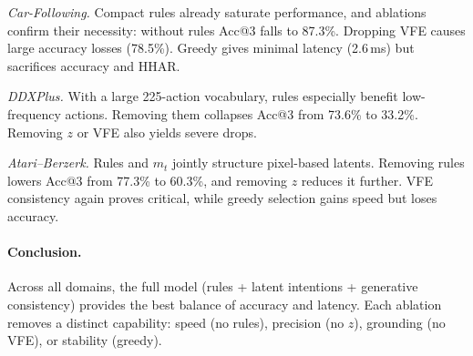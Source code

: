 \documentclass{article} %
\begin{document}
\emph{Car-Following.} Compact rules already saturate performance, 
and ablations confirm their necessity: without rules Acc@3 falls to 87.3\%.  
Dropping VFE causes large accuracy losses (78.5\%).  
Greedy gives minimal latency (2.6\,ms) but sacrifices accuracy and HHAR.  

\emph{DDXPlus.} With a large 225-action vocabulary, rules especially 
benefit low-frequency actions. Removing them collapses Acc@3 from 73.6\% 
to 33.2\%. Removing $z$ or VFE also yields severe drops.  

\emph{Atari--Berzerk.} Rules and $m_t$ jointly structure pixel-based latents.  
Removing rules lowers Acc@3 from 77.3\% to 60.3\%, and removing $z$ 
reduces it further. VFE consistency again proves critical, while greedy 
selection gains speed but loses accuracy.  
\paragraph{Conclusion.}
Across all domains, the full model (rules + latent intentions + 
generative consistency) provides the best balance of accuracy and latency.  
Each ablation removes a distinct capability: speed (no rules), 
precision (no $z$), grounding (no VFE), or stability (greedy).  
\end{document}

